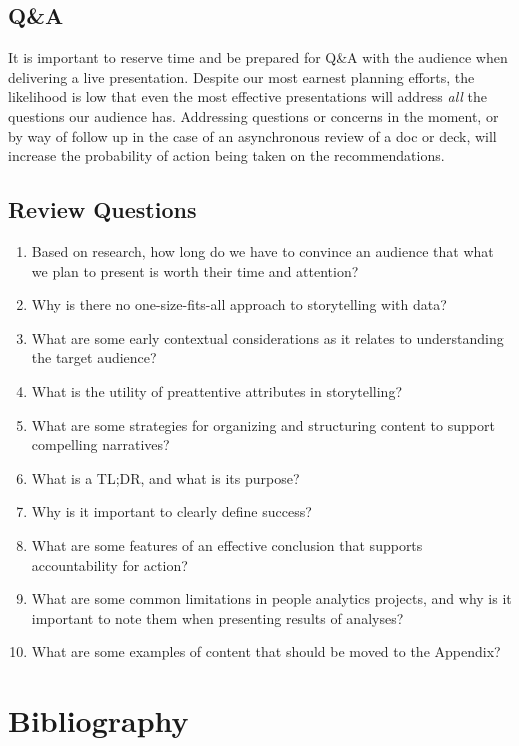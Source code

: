 \documentclass[
]{book}
\begin{document}
\hypertarget{qa}{%
\section{Q\&A}\label{qa}}

It is important to reserve time and be prepared for Q\&A with the audience when delivering a live presentation. Despite our most earnest planning efforts, the likelihood is low that even the most effective presentations will address \emph{all} the questions our audience has. Addressing questions or concerns in the moment, or by way of follow up in the case of an asynchronous review of a doc or deck, will increase the probability of action being taken on the recommendations.

\hypertarget{review-questions-14}{%
\section{Review Questions}\label{review-questions-14}}

\begin{enumerate}
\def\labelenumi{\arabic{enumi}.}
\item
  Based on research, how long do we have to convince an audience that what we plan to present is worth their time and attention?
\item
  Why is there no one-size-fits-all approach to storytelling with data?
\item
  What are some early contextual considerations as it relates to understanding the target audience?
\item
  What is the utility of preattentive attributes in storytelling?
\item
  What are some strategies for organizing and structuring content to support compelling narratives?
\item
  What is a TL;DR, and what is its purpose?
\item
  Why is it important to clearly define success?
\item
  What are some features of an effective conclusion that supports accountability for action?
\item
  What are some common limitations in people analytics projects, and why is it important to note them when presenting results of analyses?
\item
  What are some examples of content that should be moved to the Appendix?
\end{enumerate}

\hypertarget{bibli}{%
\chapter{Bibliography}\label{bibli}}
\end{document}
